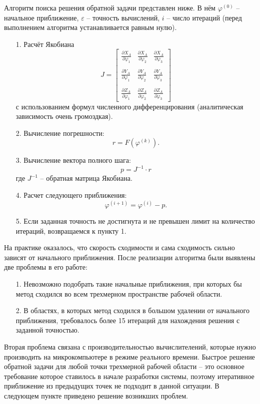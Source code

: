 Алгоритм поиска решения обратной задачи представлен ниже. В нём $ \varphi^{(0)} $ -- начальное приближение, $ \varepsilon $ -- точность вычислений, $ i $ -- число итераций (перед выполнением алгоритма устанавливается равным нулю).
\begin{itemize}
    \item[1.] Расчёт Якобиана $$ J = \begin{bmatrix}
        \frac{\partial X_A}{\partial \varphi_1} & 
        \frac{\partial X_A}{\partial \varphi_2} & 
        \frac{\partial X_A}{\partial \varphi_3} \\ \\
        \frac{\partial Y_A}{\partial \varphi_1} & 
        \frac{\partial Y_A}{\partial \varphi_2} & 
        \frac{\partial Y_A}{\partial \varphi_3} \\ \\
        \frac{\partial Z_A}{\partial \varphi_1} & 
        \frac{\partial Z_A}{\partial \varphi_2} & 
        \frac{\partial Z_A}{\partial \varphi_3}
    \end{bmatrix} $$ с использованием формул численного дифференцирования (аналитическая зависимость очень громоздкая).
    \item[2.] Вычисление погрешности: $$ r=F(\varphi^{(k)}). $$
    \item[3.] Вычисление вектора полного шага: $$ p = J^{-1} \cdot r $$ где $ J^{-1} $ -- обратная матрица Якобиана.
    \item[4.] Расчет следующего приближения: $$ \varphi^{(i+1)}=\varphi^{(i)} - p. $$ 
    \item[5.] Если заданная точность не достигнута и не превышен лимит на количество итераций, возвращаемся к пункту 1.
\end{itemize}

\noindent На практике оказалось, что скорость сходимости и сама сходимость сильно зависят от начального приближения. После реализации алгоритма были выявлены две проблемы в его работе:
\begin{itemize}
    \item[1.] Невозможно подобрать такие начальные приближения, при которых бы метод сходился во всем трехмерном пространстве рабочей области.
    \item[2.] В областях, в которых метод сходился в большом удалении от начального приближения, требовалось более 15 итераций для нахождения решения с заданной точностью.
\end{itemize}

\noindent Вторая проблема связана с производительностью вычислителений, которые нужно производить на микрокомпьютере в режиме реального времени. Быстрое решение обратной задачи для любой точки трехмерной рабочей области -- это основное требование которое ставилось в начале разработки системы, поэтому итеративное приближение из предыдущих точек не  подходит в данной ситуации. В следующем пункте приведено решение возникших проблем.

